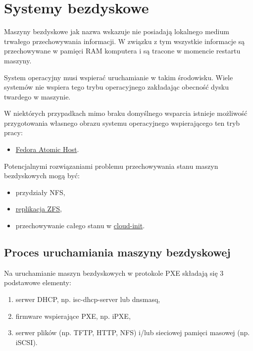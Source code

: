 \documentclass[a4paper,12pt,twoside,openany]{report}
\providecommand{\tightlist}{%
  \setlength{\itemsep}{0pt}\setlength{\parskip}{0pt}}
\begin{document}
\hypertarget{systemy-bezdyskowe}{%
\chapter{Systemy bezdyskowe}\label{systemy-bezdyskowe}}

Maszyny bezdyskowe jak nazwa wskazuje nie posiadają lokalnego medium
trwałego przechowywania informacji. W związku z tym wszystkie informacje
są przechowywane w pamięci RAM komputera i są tracone w momencie
restartu maszyny.

System operacyjny musi wspierać uruchamianie w takim środowisku. Wiele
systemów nie wspiera tego trybu operacyjnego zakładając obecność dysku
twardego w maszynie.

W niektórych przypadkach mimo braku domyślnego wsparcia istnieje
możliwość przygotowania własnego obrazu systemu operacyjnego
wspierającego ten tryb pracy:

\begin{itemize}
\tightlist
\item
  \href{https://www.projectatomic.io/blog/2015/05/building-and-running-live-atomic/}{Fedora
  Atomic Host}.
\end{itemize}

Potencjalnymi rozwiązaniami problemu przechowywania stanu maszyn
bezdyskowych mogą być:

\begin{itemize}
\tightlist
\item
  przydziały NFS,
\item
  \href{https://arstechnica.com/information-technology/2015/12/rsync-net-zfs-replication-to-the-cloud-is-finally-here-and-its-fast/}{replikacja
  ZFS},
\item
  przechowywanie całego stanu w
  \protect\hyperlink{cloud-init-config}{cloud-init}.
\end{itemize}

\hypertarget{proces-uruchamiania-maszyny-bezdyskowej}{%
\section{Proces uruchamiania maszyny
bezdyskowej}\label{proces-uruchamiania-maszyny-bezdyskowej}}

Na uruchamianie maszyn bezdyskowych w protokole PXE składają się 3
podstawowe elementy:

\begin{enumerate}
\def\labelenumi{\arabic{enumi}.}
\tightlist
\item
  serwer DHCP, np. isc-dhcp-server lub dnsmasq,
\item
  firmware wspierające PXE, np. iPXE,
\item
  serwer plików (np. TFTP, HTTP, NFS) i/lub sieciowej pamięci masowej
  (np. iSCSI).
\end{enumerate}
\end{document}
